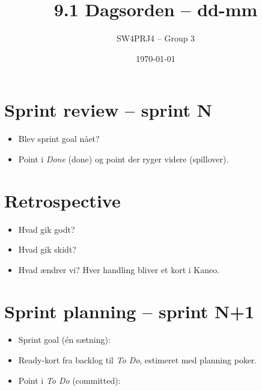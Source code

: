 \documentclass[a4paper,11pt]{article}
\title{9.1 Dagsorden -- dd-mm}
\author{SW4PRJ4 -- Group 3}
\date{\today}
\begin{document}
\maketitle


\section*{Sprint review -- sprint N}
\begin{itemize}
    \item Blev sprint goal nået?
    \item Point i \emph{Done} (done) og point der ryger videre (spillover).
\end{itemize}

\section*{Retrospective}
\begin{itemize}
    \item Hvad gik godt?
    \item Hvad gik skidt?
    \item Hvad ændrer vi? Hver handling bliver et kort i Kaneo.
\end{itemize}

\section*{Sprint planning -- sprint N+1}
\begin{itemize}
    \item Sprint goal (én sætning):
    \item Ready-kort fra backlog til \emph{To Do}, estimeret med planning poker.
    \item Point i \emph{To Do} (committed):
\end{itemize}
\end{document}
